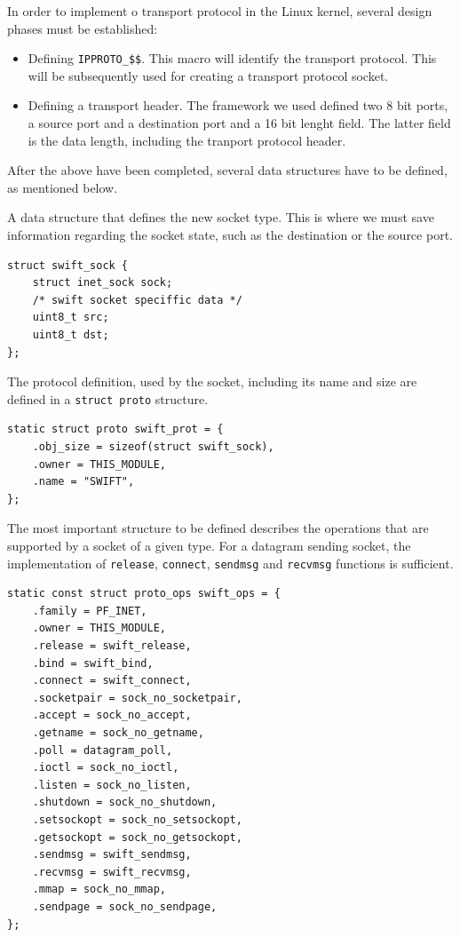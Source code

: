 In order to implement o transport protocol in the Linux kernel, several design
phases must be established:

\begin{itemize}
  \item Defining \texttt{IPPROTO\_\$\$}. This macro will identify the
  transport protocol. This will be subsequently used for creating a transport
  protocol socket.
  \item Defining a transport header. The framework we used defined two 8 bit
  ports, a source port and a destination port and a 16 bit lenght field. The
  latter field is the data length, including the tranport protocol header.
\end{itemize}

After the above have been completed, several data structures have to be
defined, as mentioned below.

A data structure that defines the new socket type. This is where we must save
information regarding the socket state, such as the destination or the source
port.
\begin{verbatim}
struct swift_sock {
    struct inet_sock sock;
    /* swift socket speciffic data */
    uint8_t src;
    uint8_t dst;
};
\end{verbatim}

The protocol definition, used by the socket, including its name and size are
defined in a \texttt{struct proto} structure.
\begin{verbatim}
static struct proto swift_prot = {
    .obj_size = sizeof(struct swift_sock),
    .owner = THIS_MODULE,
    .name = "SWIFT",
};
\end{verbatim}

The most important structure to be defined describes the operations that are
supported by a socket of a given type. For a datagram sending socket, the
implementation of \texttt{release}, \texttt{connect}, \texttt{sendmsg} and
\texttt{recvmsg} functions is sufficient.
\begin{verbatim}
static const struct proto_ops swift_ops = {
    .family = PF_INET,
    .owner = THIS_MODULE,
    .release = swift_release,
    .bind = swift_bind,
    .connect = swift_connect,
    .socketpair = sock_no_socketpair,
    .accept = sock_no_accept,
    .getname = sock_no_getname,
    .poll = datagram_poll,
    .ioctl = sock_no_ioctl,
    .listen = sock_no_listen,
    .shutdown = sock_no_shutdown,
    .setsockopt = sock_no_setsockopt,
    .getsockopt = sock_no_getsockopt,
    .sendmsg = swift_sendmsg,
    .recvmsg = swift_recvmsg,
    .mmap = sock_no_mmap,
    .sendpage = sock_no_sendpage,
};
\end{verbatim}

